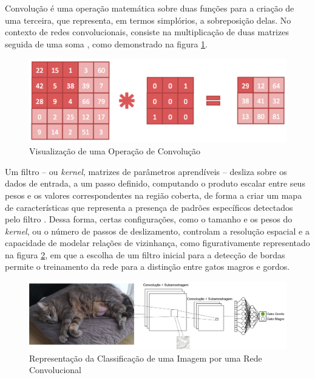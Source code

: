 Convolução é uma operação matemática sobre duas funções para a criação de uma terceira, que representa, em termos simplórios, a sobreposição delas. No contexto de redes convolucionais, consiste na multiplicação de duas matrizes seguida de uma soma \cite{origindl}, como demonstrado na figura \ref{fig:convolution}.

\begin{figure}[H]
	\caption{\label{fig:convolution}Visualização de uma Operação de Convolução}
    \begin{center}
    \includegraphics[width=0.75\linewidth]{images/convolution.png}
	\end{center}
\end{figure}


Um filtro -- ou \textit{kernel}, matrizes de parâmetros aprendíveis -- desliza sobre os dados de entrada, a um passo definido, computando o produto escalar entre seus pesos e os valores correspondentes na região coberta, de forma a criar um mapa de características que representa a presença de padrões específicos detectados pelo filtro \cite{deeplearningbook}. Dessa forma, certas configurações, como o tamanho e os pesos do \textit{kernel}, ou o número de passos de deslizamento, controlam a resolução espacial e a capacidade de modelar relações de vizinhança, como figurativamente representado na figura \ref{fig:nono}, em que a escolha de um filtro inicial para a detecção de bordas permite o treinamento da rede para a distinção entre gatos magros e gordos.

\begin{figure}[H]
	\caption{\label{fig:nono}Representação da Classificação de uma Imagem por uma Rede Convolucional}
    \begin{center}
    \includegraphics[width=1\linewidth]{images/nono.png}
	\end{center}
\end{figure}

